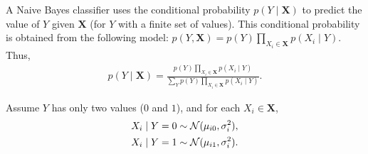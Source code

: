 \documentclass[11pt]{article}
\renewcommand{\vec}[1]{\mathbf{#1}}
\begin{document}
A Naive Bayes classifier uses the conditional probability $p(Y \mid \vec{X})$ to predict the value of $Y$ given $\vec{X}$ (for $Y$ with a finite set of values).
This conditional probability is obtained from the following model: $p(Y, \vec{X}) = p(Y) \prod_{X_i \in \vec{X}} p(X_i \mid Y)$.
Thus,
\begin{align*}
p(Y \mid \vec{X}) =
\frac{
p(Y) \prod_{X_i \in \vec{X}} p(X_i \mid Y)
}{
\sum_Y p(Y) \prod_{X_i \in \vec{X}} p(X_i \mid Y)
}.
\end{align*}

Assume $Y$ has only two values ($0$ and $1$), and for each $X_i \in \vec{X}$,
\begin{align*}
X_i \mid Y=0 &\sim {\cal N}(\mu_{i0}, \sigma_i^2),\\
X_i \mid Y=1 &\sim {\cal N}(\mu_{i1}, \sigma_i^2).
\end{align*}
\end{document}
